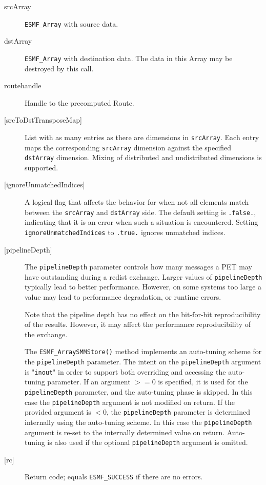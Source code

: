      \begin{description}
  
     \item [srcArray]
       {\tt ESMF\_Array} with source data.
  
     \item [dstArray]
       {\tt ESMF\_Array} with destination data. The data in this Array may be
       destroyed by this call.
  
     \item [routehandle]
       Handle to the precomputed Route.
  
     \item [{[srcToDstTransposeMap]}]
       List with as many entries as there are dimensions in {\tt srcArray}. Each
       entry maps the corresponding {\tt srcArray} dimension against the 
       specified {\tt dstArray} dimension. Mixing of distributed and
       undistributed dimensions is supported.
  
     \item [{[ignoreUnmatchedIndices]}]
       A logical flag that affects the behavior for when not all elements match
       between the {\tt srcArray} and {\tt dstArray} side. The default setting
       is {\tt .false.}, indicating that it is an error when such a situation is 
       encountered. Setting {\tt ignoreUnmatchedIndices} to {\tt .true.} ignores
       unmatched indices.
  
     \item [{[pipelineDepth]}]
       The {\tt pipelineDepth} parameter controls how many messages a PET
       may have outstanding during a redist exchange. Larger values
       of {\tt pipelineDepth} typically lead to better performance. However,
       on some systems too large a value may lead to performance degradation,
       or runtime errors.
  
       Note that the pipeline depth has no effect on the bit-for-bit
       reproducibility of the results. However, it may affect the performance
       reproducibility of the exchange.
  
       The {\tt ESMF\_ArraySMMStore()} method implements an auto-tuning scheme
       for the {\tt pipelineDepth} parameter. The intent on the 
       {\tt pipelineDepth} argument is "{\tt inout}" in order to 
       support both overriding and accessing the auto-tuning parameter.
       If an argument $>= 0$ is specified, it is used for the 
       {\tt pipelineDepth} parameter, and the auto-tuning phase is skipped.
       In this case the {\tt pipelineDepth} argument is not modified on
       return. If the provided argument is $< 0$, the {\tt pipelineDepth}
       parameter is determined internally using the auto-tuning scheme. In this
       case the {\tt pipelineDepth} argument is re-set to the internally
       determined value on return. Auto-tuning is also used if the optional 
       {\tt pipelineDepth} argument is omitted.
  
     \item [{[rc]}]
       Return code; equals {\tt ESMF\_SUCCESS} if there are no errors.
     \end{description}
   

